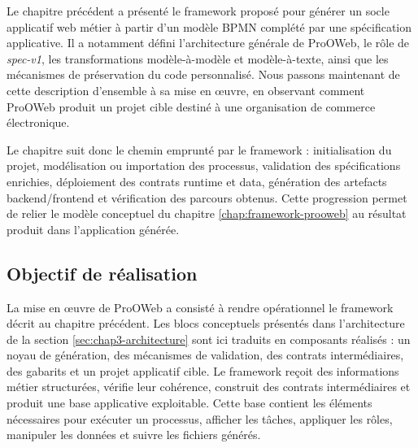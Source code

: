 \label{chap:mise-oeuvre-evaluation-prooweb}


Le chapitre précédent a présenté le framework proposé pour générer un socle applicatif web métier à partir d'un modèle BPMN complété par une spécification applicative. Il a notamment défini l'architecture générale de ProOWeb, le rôle de \textit{spec-v1}, les transformations modèle-à-modèle et modèle-à-texte, ainsi que les mécanismes de préservation du code personnalisé. Nous passons maintenant de cette description d'ensemble à sa mise en œuvre, en observant comment ProOWeb produit un projet cible destiné à une organisation de commerce électronique.

Le chapitre suit donc le chemin emprunté par le framework : initialisation du projet, modélisation ou importation des processus, validation des spécifications enrichies, déploiement des contrats runtime et data, génération des artefacts backend/frontend et vérification des parcours obtenus. Cette progression permet de relier le modèle conceptuel du chapitre \ref{chap:framework-prooweb} au résultat produit dans l'application générée.

\label{sec:chap4-environnement}

\subsection{Objectif de réalisation}

La mise en œuvre de ProOWeb a consisté à rendre opérationnel le framework décrit au chapitre précédent. Les blocs conceptuels présentés dans l'architecture de la section \ref{sec:chap3-architecture} sont ici traduits en composants réalisés : un noyau de génération, des mécanismes de validation, des contrats intermédiaires, des gabarits et un projet applicatif cible. Le framework reçoit des informations métier structurées, vérifie leur cohérence, construit des contrats intermédiaires et produit une base applicative exploitable. Cette base contient les éléments nécessaires pour exécuter un processus, afficher les tâches, appliquer les rôles, manipuler les données et suivre les fichiers générés.


